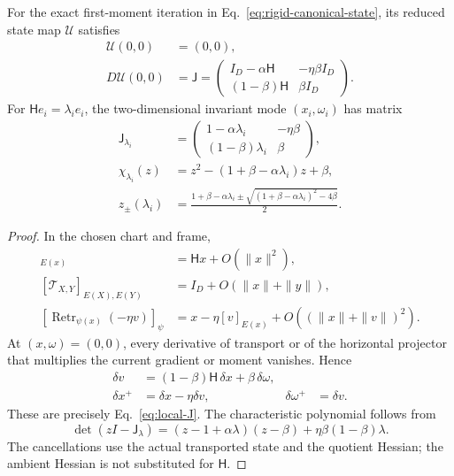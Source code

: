 \begin{theorem}
\label{thm:local-exact-jacobian}
For the exact first-moment iteration in
Eq.~\eqref{eq:rigid-canonical-state}, its reduced state map
$\mathscr U$ satisfies
\begin{align}
\mathscr U(0,0)&=(0,0),\\
D\mathscr U(0,0)
&=\mathsf J
=\begin{pmatrix}
I_D-\alpha\mathsf H&-\eta\beta I_D\\
(1-\beta)\mathsf H&\beta I_D
\end{pmatrix}.
\label{eq:local-J}
\end{align}
For $\mathsf He_i=\lambda_i e_i$, the two-dimensional invariant
mode $(x_i,\omega_i)$ has matrix
\begin{align}
\mathsf J_{\lambda_i}
&=\begin{pmatrix}1-\alpha\lambda_i&-\eta\beta\\
(1-\beta)\lambda_i&\beta\end{pmatrix},\\
\chi_{\lambda_i}(z)
&=z^2-(1+\beta-\alpha\lambda_i)z+\beta,\\
z_{\pm}(\lambda_i)
&=\frac{1+\beta-\alpha\lambda_i
\pm\sqrt{(1+\beta-\alpha\lambda_i)^2-4\beta}}{2}.
\label{eq:local-roots}
\end{align}
\end{theorem}
\begin{proof}
In the chosen chart and frame,
\begin{align}
[\qgrad_g f(\psi(x))]_{E(x)}
&=\mathsf Hx+O(\|x\|^2),\\
[\mathcal T_{X,Y}]_{E(X),E(Y)}
&=I_D+O(\|x\|+\|y\|),\\
[\operatorname{Retr}_{\psi(x)}(-\eta v)]_\psi
&=x-\eta[v]_{E(x)}+O((\|x\|+\|v\|)^2).
\end{align}
At $(x,\omega)=(0,0)$, every derivative of transport or of the
horizontal projector that multiplies the current gradient or moment
vanishes. Hence
\begin{align}
\delta v&=(1-\beta)\mathsf H\,\delta x+\beta\,\delta\omega,\\
\delta x^+&=\delta x-\eta\delta v,&
\delta\omega^+&=\delta v .
\end{align}
These are precisely Eq.~\eqref{eq:local-J}. The characteristic
polynomial follows from
\begin{equation}
\det(zI-\mathsf J_\lambda)
=(z-1+\alpha\lambda)(z-\beta)
+\eta\beta(1-\beta)\lambda .
\end{equation}
The cancellations use the actual transported state and the
quotient Hessian; the ambient Hessian is not substituted for
$\mathsf H$.
\end{proof}

